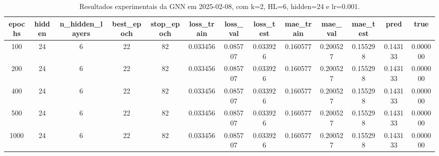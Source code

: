 \begin{table}[h]
\centering
\caption{Resultados experimentais da GNN em 2025-02-08, com k=2, HL=6, hidden=24 e lr=0.001.}
\label{tab:gnn_results_k2_hl6_h24_d20250208}
\begin{tabular}{ccccccccccccc}
\toprule
epochs & hidden & n\_hidden\_layers & best\_epoch & stop\_epoch & loss\_train & loss\_val & loss\_test & mae\_train & mae\_val & mae\_test & pred & true \\
\midrule
100 & 24 & 6 & 22 & 82 & 0.033456 & 0.085707 & 0.033926 & 0.160577 & 0.200527 & 0.155298 & 0.143133 & 0.000000 \\
200 & 24 & 6 & 22 & 82 & 0.033456 & 0.085707 & 0.033926 & 0.160577 & 0.200527 & 0.155298 & 0.143133 & 0.000000 \\
400 & 24 & 6 & 22 & 82 & 0.033456 & 0.085707 & 0.033926 & 0.160577 & 0.200527 & 0.155298 & 0.143133 & 0.000000 \\
500 & 24 & 6 & 22 & 82 & 0.033456 & 0.085707 & 0.033926 & 0.160577 & 0.200527 & 0.155298 & 0.143133 & 0.000000 \\
1000 & 24 & 6 & 22 & 82 & 0.033456 & 0.085707 & 0.033926 & 0.160577 & 0.200527 & 0.155298 & 0.143133 & 0.000000 \\
\bottomrule
\end{tabular}
\end{table}
